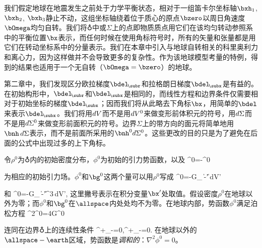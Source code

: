 
我们假定地球在地震发生之前处于力学平衡状态，相对于一组笛卡尔坐标轴$\bxh_1$, $\bxh_2$, $\bxh_3$静止不动，这组坐标轴绕着位于质心的原点$\bzero$以周日角速度$\bOmega$均匀自转。我们将$\earth$中或$\Sigma$上的点即物质质点用它们在该均匀转动参照系中的平衡位置$\bx$表示，而任何时候在使用角标符号时，所有的矢量和张量都是用它们在转动坐标系中的分量表示。我们在本章中引入与地球自转相关的科里奥利力和离心力，因为这样做并不会导致更多的复杂性。作为该地球模型考量的特例，得到的结果也适用于一个无自转（$\bOmega=\bzero$）的地球。 


第二章中，我们发现区分欧拉梯度$\bdel_{\!\subr}$和拉格朗日梯度$\bdel_{\!\subx}$是有益的。
%
%
%
%
在初始构形中，$\bdel_{\!\subr}$和$\bdel_{\!\subx}$是相同的，而线性方程和边界条件仅需要相对于初始坐标的梯度$\bdel_{\!\subx}$；因而我们将从此略去下角标$\bx$，用简单的$\bdel$来表示$\bdel_{\!\subx}$。我们将用$d\/V$而不是用$d\/V^0$来做变形前体积元的符号，用$d\/\Sigma$而不是用$d\/\Sigma^0$来做变形前面积元的符号。边界$\Sigma$上的带方向的面元将简单地用$\bnh\,d\/\Sigma$表示，而不是前面所采用的$\bnh^0d\/\Sigma^0$。这些更改的目的只是为了避免在后面的公式中出现过多的上下角标。

令$\rho^0$为$\earth$内的初始密度分布，$\phi^0$为初始的引力势函数，以及
\eq
\label{3.gnotphinot}
\bg^0=-\bdel\phi^0
\en 

为相应的初始引力场。$\phi^0$和$\bg^0$这两个量可以用$\rho^0$写成
\eq
\label{3.phinot}
\phi^0=-G\int_{\subearth}\frac{\rho^{0\prime}}
{\|\bx-\bx'\|}\,dV'
\en

和
\eq
\bg^0=-G\int_{\subearth}
{\|\bx-\bx'\|^3}\,dV',
\en
这里撇号表示在积分变量$\bx'$处取值。假设密度$\rho^0$在地球以外为零；而$\phi^0$和$\bg^0$在$\allspace$内处处均不为零。在地球内部，势函数$\phi^0$满足泊松方程
%
\eq
\label{3.Poisson0}
\nabla^2\phi^0=4\pi G\rho^0
\en

连同在边界$\earth$上的连续性条件
\eq
[\phi^0]^+_-=0,^+_-=0.
\en
在地球以外的$\allspace -\earth$区域，势函数是{\em 调和的}：$\nabla^2\phi^0=0$。
%
%
%


